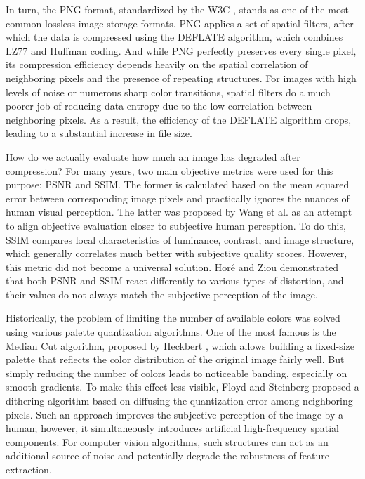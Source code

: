 \documentclass[12pt, a4paper]{article}
\begin{document}
In turn, the PNG format, standardized by the W3C \cite{w3c2003}, stands as one of the most common lossless image storage formats. PNG applies a set of spatial filters, after which the data is compressed using the DEFLATE algorithm, which combines LZ77 and Huffman coding. And while PNG perfectly preserves every single pixel, its compression efficiency depends heavily on the spatial correlation of neighboring pixels and the presence of repeating structures. For images with high levels of noise or numerous sharp color transitions, spatial filters do a much poorer job of reducing data entropy due to the low correlation between neighboring pixels. As a result, the efficiency of the DEFLATE algorithm drops, leading to a substantial increase in file size.

How do we actually evaluate how much an image has degraded after compression? For many years, two main objective metrics were used for this purpose: PSNR and SSIM. The former is calculated based on the mean squared error between corresponding image pixels and practically ignores the nuances of human visual perception. The latter was proposed by Wang et al. \cite{wang2004} as an attempt to align objective evaluation closer to subjective human perception. To do this, SSIM compares local characteristics of luminance, contrast, and image structure, which generally correlates much better with subjective quality scores. However, this metric did not become a universal solution. Horé and Ziou \cite{hore2010} demonstrated that both PSNR and SSIM react differently to various types of distortion, and their values do not always match the subjective perception of the image.

Historically, the problem of limiting the number of available colors was solved using various palette quantization algorithms. One of the most famous is the Median Cut algorithm, proposed by Heckbert \cite{heckbert1982}, which allows building a fixed-size palette that reflects the color distribution of the original image fairly well. But simply reducing the number of colors leads to noticeable banding, especially on smooth gradients. To make this effect less visible, Floyd and Steinberg \cite{floyd1976} proposed a dithering algorithm based on diffusing the quantization error among neighboring pixels. Such an approach improves the subjective perception of the image by a human; however, it simultaneously introduces artificial high-frequency spatial components. For computer vision algorithms, such structures can act as an additional source of noise and potentially degrade the robustness of feature extraction.
\end{document}
